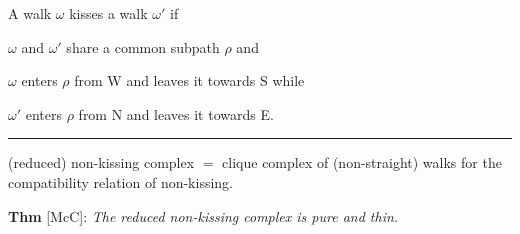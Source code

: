 \documentclass[portrait,final,a0paper,fontscale=0.25]{baposter}
\theoremstyle{definition}
\begin{document}
\begin{poster}
{\medskip

A walk $\omega$ {\color{green} kisses} a walk $\omega'$ if 
\begin{compactitem}
\item $\omega$ and $\omega'$ share a common subpath $\rho$ and
\item $\omega$ enters $\rho$ from W and leaves it towards S while
\item $\omega'$ enters $\rho$ from N and leaves it towards E.
\end{compactitem}

\hspace{-.25cm}
{\color{green} \rule{10.02cm}{1pt}}
\vspace{-.35cm}

{\color{green} (reduced) non-kissing complex} $=$ clique complex of (non-straight) walks for the compatibility relation of non-kissing.

\medskip
{\color{green} \bf Thm} [McC]: {\it The reduced non-kissing complex is pure and thin.}

}
\end{poster}
\end{document}
